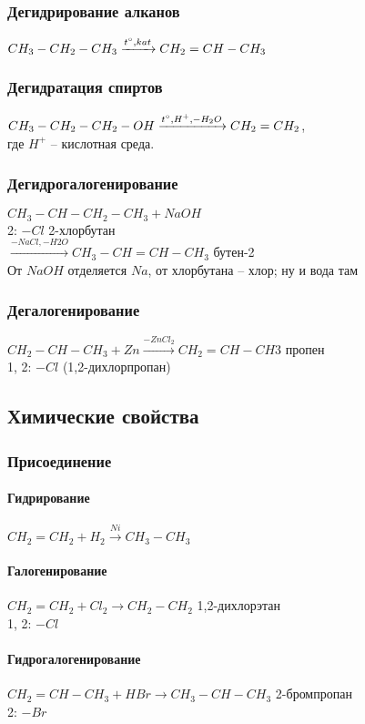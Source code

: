 \documentclass[a4paper]{article}
\begin{document}
	\subsubsection{Дегидрирование алканов}
	$CH_{3}-CH_{2}-CH_{3} \xrightarrow{t \degree, kat} CH_{2}=CH-CH_{3}$
	\subsubsection{Дегидратация спиртов}
	$CH_{3}-CH_{2}-CH_{2}-OH \xrightarrow{t\degree, H^{+}, -H_{2}O} CH_{2}=CH_{2}$,\\
	где $H^{+}$ -- кислотная среда.
	\subsubsection{Дегидрогалогенирование}
	$CH_{3}-CH-CH_{2}-CH_{3}+NaOH$\\
	2: $-Cl$ 2-хлорбутан\\
	$\xrightarrow{-NaCl,-H2O} CH_{3}-CH=CH-CH_{3}$ бутен-2\\
	От $NaOH$ отделяется $Na$, от хлорбутана -- хлор; ну и вода там
	\subsubsection{Дегалогенирование}
	$CH_{2}-CH-CH_{3}+Zn \xrightarrow{-ZnCl_{2}} CH_{2}=CH-CH{3}$ пропен\\
	1, 2: $-Cl$ (1,2-дихлорпропан)
\subsection{Химические свойства}
	\subsubsection{Присоединение}
		\paragraph{Гидрирование}
		$CH_{2}=CH_{2}+H_2 \xrightarrow{Ni} CH_3-CH_3$
		\paragraph{Галогенирование}
		$CH_2=CH_2+Cl_2 \xrightarrow{} CH_2-CH_2$
		1,2-дихлорэтан\\
		1, 2: $-Cl$
		\paragraph{Гидрогалогенирование}
		$CH_2=CH-CH_{3}+HBr \xrightarrow{} CH_3-CH-CH_3$ 2-бромпропан\\
		2: $-Br$
\end{document}
